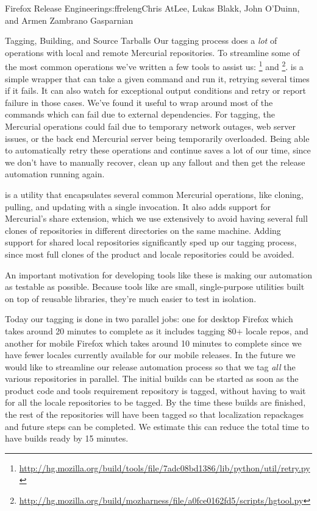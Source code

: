\begin{aosachapter}{Firefox Release Engineering}{s:ffreleng}{Chris AtLee, Lukas Blakk, John O'Duinn, and Armen Zambrano Gasparnian}
\begin{aosasect1}{Tagging, Building, and Source Tarballs}
Our tagging process does a \emph{lot} of operations with local and
remote Mercurial repositories. To streamline some of the most
common operations we've written a few tools to assist us:
\footnote{\url{http://hg.mozilla.org/build/tools/file/7adc08bd1386/lib/python/util/retry.py}}
and
\footnote{\url{http://hg.mozilla.org/build/mozharness/file/a0fce0162fd5/scripts/hgtool.py}}.
 is a simple wrapper that can take a given command and
run it, retrying several times if it fails. It can also watch for
exceptional output conditions and retry or report failure in those
cases. We've found it useful to wrap  around most of the
commands which can fail due to external dependencies.  For tagging,
the Mercurial operations could fail due to temporary network outages, web
server issues, or the back end Mercurial server being temporarily
overloaded. Being able to automatically retry these operations and
continue saves a lot of our time, since we don't have to manually
recover, clean up any fallout and then get the release automation running again.
    
 is a utility that encapsulates several common Mercurial
operations, like cloning, pulling, and updating with a single invocation. It
also adds support for Mercurial's share extension, which we use extensively
to avoid having several full clones of repositories in
different directories on the same machine.  Adding support for shared
local repositories significantly sped up our tagging process, since most
full clones of the product and locale repositories could be avoided.
    
An important motivation for developing tools like these is 
making our automation as testable as possible. Because tools like
 are small, single-purpose utilities built on top of
reusable libraries, they're much easier to test in isolation.

Today our tagging is done in two parallel jobs: one for desktop
Firefox which takes around 20 minutes to complete as it includes
tagging 80+ locale repos, and another for mobile Firefox which takes
around 10 minutes to complete since we have fewer locales currently
available for our mobile releases. In the future we would like to
streamline our release automation process so that we tag \emph{all}
the various repositories in parallel. The initial builds can be
started as soon as the product code and tools requirement
repository is tagged, without having to wait for all the locale
repositories to be tagged. By the time these builds are finished, the
rest of the repositories will have been tagged so that localization
repackages and future steps can be completed.  We estimate this can
reduce the total time to have builds ready by 15 minutes.


\end{aosasect1}
\end{aosachapter}
